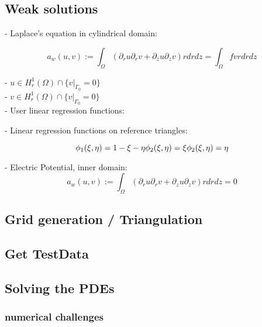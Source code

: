 \documentclass[parskip=half, titlepage=yes, 12pt, BCOR=12mm, DIV=calc]{scrartcl}
\begin{document}
\subsection{Weak solutions}

- Laplace's equation in cylindrical domain:

\begin{equation}
    a_w(u,v) := \int_{\Omega} (\partial_r u \partial_r v + \partial_z u \partial_z v) r drdz = \int_{\Omega} f v r dr dz
\end{equation}

- $u \in H_r^1(\Omega) \cap \{v|_{\Gamma_{0}} = 0 \} $ \\
- $v \in H_r^1(\Omega) \cap \{v|_{\Gamma_{0}} = 0 \} $ \\

- User linear regression functions:


- Linear regression functions on reference triangles:

\begin{equation}
    \phi_1(\xi, \eta) = 1 - \xi - \eta \\
    \phi_2(\xi, \eta) = \xi \\
    \phi_2(\xi, \eta) = \eta \\
\end{equation}



- Electric Potential, inner domain: \\

\begin{equation}
    a_w(u,v) := \int_{\Omega} (\partial_r u \partial_r v + \partial_z u \partial_z v) r drdz = 0 
\end{equation}


\subsection{Grid generation / Triangulation}

\subsection{Get TestData}

\subsection{Solving the PDEs}
\subsubsection{numerical challenges}
\end{document}
